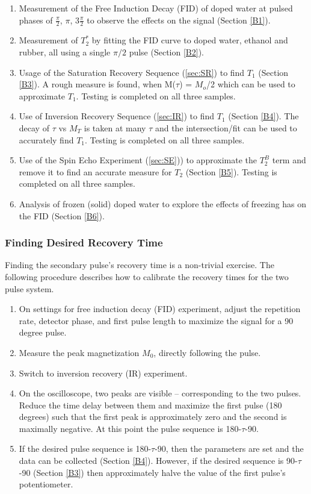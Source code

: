 \begin{enumerate}
    \item Measurement of the Free Induction Decay (FID) of doped water at pulsed phases of $\frac{\pi}{2}$, $\pi$, $3\frac{\pi}{2}$ to observe the effects on the signal (Section \ref{B1}).
    \item Measurement of $T^*_2$ by fitting the FID curve to doped water, ethanol and rubber, all using a single $\pi/2$ pulse (Section \ref{B2}).
    \item Usage of the Saturation Recovery Sequence (\ref{sec:SR}) to find $T_1$ (Section \ref{B3}). A rough measure is found, when M($\tau$) = $M_o$/2 which can be used to approximate $T_1$. Testing is completed on all three samples.
    \item Use of Inversion Recovery Sequence (\ref{sec:IR}) to find $T_1$ (Section \ref{B4}). The decay of $\tau$ vs $M_T$ is taken at many $\tau$ and the intersection/fit can be used to accurately find $T_1$. Testing is completed on all three samples.
    \item Use of the Spin Echo Experiment (\ref{sec:SE})) to approximate the $T^B_2$ term and remove it to find an accurate measure for $T_2$ (Section \ref{B5}). Testing is completed on all three samples.
    \item Analysis of frozen (solid) doped water to explore the effects of freezing has on the FID (Section \ref{B6}). 
\end{enumerate}


\subsubsection{Finding Desired Recovery Time}

Finding the secondary pulse's recovery time is a non-trivial exercise. The following procedure describes how to calibrate the recovery times for the two pulse system.
\begin{enumerate}
    \item On settings for free induction decay (FID) experiment, adjust the repetition rate, detector phase, and first pulse length to maximize the signal for a 90 degree pulse.
    \item Measure the peak magnetization $M_0$, directly following the pulse.
    \item Switch to inversion recovery (IR) experiment.
    \item On the oscilloscope, two peaks are visible -- corresponding to the two pulses. Reduce the time delay between them and maximize the first pulse (180 degrees) such that the first peak is approximately zero and the second is maximally negative. At this point the pulse sequence is 180-$\tau$-90.
    \item If the desired pulse sequence is 180-$\tau$-90, then the parameters are set and the data can be collected (Section \ref{B4}). However, if the desired sequence is 90-$\tau$-90 (Section \ref{B3}) then approximately halve the value of the first pulse's potentiometer.
\end{enumerate}

